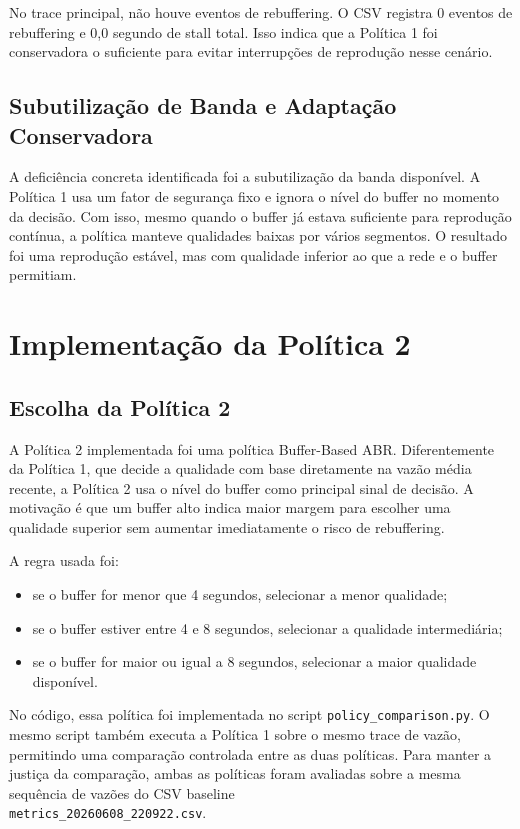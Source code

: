 \documentclass[
    12pt,
    a4paper,
    oneside
]{article}
\begin{document}
No trace principal, não houve eventos de rebuffering. O CSV registra 0 eventos de rebuffering e 0,0 segundo de stall total. Isso indica que a Política 1 foi conservadora o suficiente para evitar interrupções de reprodução nesse cenário.

\subsection{Subutilização de Banda e Adaptação Conservadora}

A deficiência concreta identificada foi a subutilização da banda disponível. A Política 1 usa um fator de segurança fixo e ignora o nível do buffer no momento da decisão. Com isso, mesmo quando o buffer já estava suficiente para reprodução contínua, a política manteve qualidades baixas por vários segmentos. O resultado foi uma reprodução estável, mas com qualidade inferior ao que a rede e o buffer permitiam.


\section{Implementação da Política 2}
\subsection{Escolha da Política 2}

A Política 2 implementada foi uma política Buffer-Based ABR. Diferentemente da Política 1, que decide a qualidade com base diretamente na vazão média recente, a Política 2 usa o nível do buffer como principal sinal de decisão. A motivação é que um buffer alto indica maior margem para escolher uma qualidade superior sem aumentar imediatamente o risco de rebuffering.

A regra usada foi:

\begin{itemize}
    \item se o buffer for menor que 4 segundos, selecionar a menor qualidade;
    \item se o buffer estiver entre 4 e 8 segundos, selecionar a qualidade intermediária;
    \item se o buffer for maior ou igual a 8 segundos, selecionar a maior qualidade disponível.
\end{itemize}

No código, essa política foi implementada no script \texttt{policy\_comparison.py}. O mesmo script também executa a Política 1 sobre o mesmo trace de vazão, permitindo uma comparação controlada entre as duas políticas. Para manter a justiça da comparação, ambas as políticas foram avaliadas sobre a mesma sequência de vazões do CSV baseline \\ \texttt{metrics\_20260608\_220922.csv}.
\end{document}
